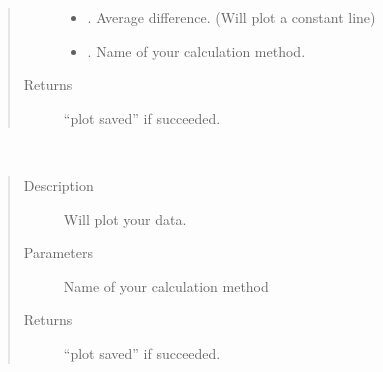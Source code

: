 \documentclass[letterpaper,10pt,english]{sphinxmanual}
\begin{document}
\begin{fulllineitems}
\begin{fulllineitems}
\begin{quote}
\begin{description}
\begin{itemize}
\item {} 
\sphinxAtStartPar
{} \textendash{} . Average difference. (Will plot a constant line)

\item {} 
\sphinxAtStartPar
{} \textendash{} . Name of your calculation method.

\end{itemize}

\item[{Returns}] \leavevmode
\sphinxAtStartPar
“plot saved” if succeeded.

\end{description}\end{quote}

\end{fulllineitems}


\begin{fulllineitems}
\label{\detokenize{DwdPlotter:DwdPlotter.PlotterForData.plotting_data}}~\begin{quote}\begin{description}
\item[{Description}] \leavevmode
\sphinxAtStartPar
Will plot your data.

\item[{Parameters}] \leavevmode
\sphinxAtStartPar
{} \textendash{}  Name of your calculation method

\item[{Returns}] \leavevmode
\sphinxAtStartPar
“plot saved” if succeeded.

\end{description}\end{quote}

\end{fulllineitems}


\end{fulllineitems}

\end{document}
